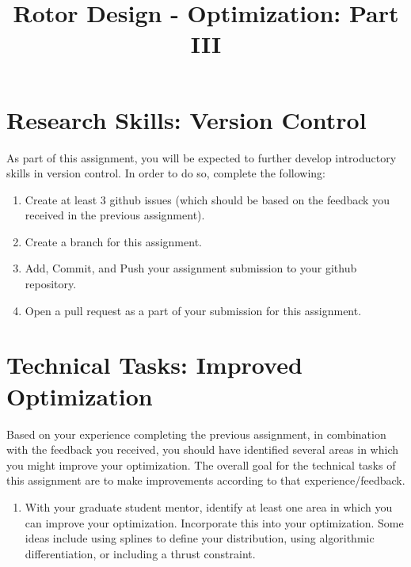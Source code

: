 \documentclass[11pt]{article}
\title{Rotor Design - Optimization: Part III}
\date{}
\begin{document}
	
\maketitle
\vspace{-2cm}

\section{Research Skills: Version Control}

As part of this assignment, you will be expected to further develop introductory skills in version control.
In order to do so, complete the following:
\begin{enumerate}[label=\alph*.]
	\item Create at least 3 github issues (which should be based on the feedback you received in the previous assignment).
	\item Create a branch for this assignment.
	\item Add, Commit, and Push your assignment submission to your github repository.
	\item Open a pull request as a part of your submission for this assignment.
\end{enumerate}

	



\section{Technical Tasks: Improved Optimization}
	
Based on your experience completing the previous assignment, in combination with the feedback you received, you should have identified several areas in which you might improve your optimization.
The overall goal for the technical tasks of this assignment are to make improvements according to that experience/feedback.

\begin{enumerate}[label=\alph*.]
	\item With your graduate student mentor, identify at least one area in which you can improve your optimization. Incorporate this into your optimization. Some ideas include using splines to define your distribution, using algorithmic differentiation, or including a thrust constraint.
\end{enumerate}
	
\end{document}
